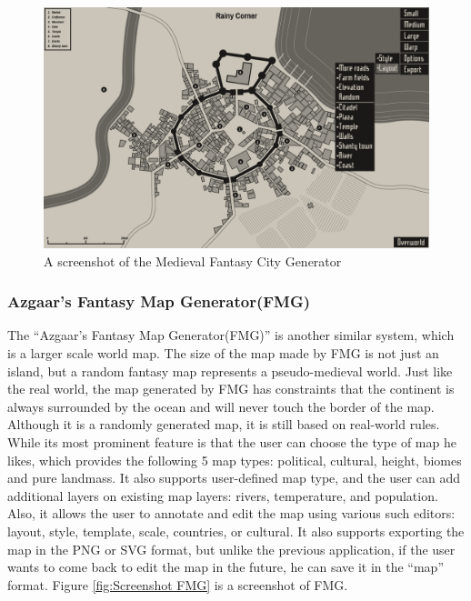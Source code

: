 \begin{figure}[!htb]
\centering
\includegraphics[width=\textwidth]{section01/assets/screenshot_MFCG.png}
\caption[A screenshot of the Medieval Fantasy City Generator]{\label{fig:Screenshot MFCG}A screenshot of the Medieval Fantasy City Generator}
\end{figure}

\subsubsection{Azgaar's Fantasy Map Generator(FMG)}
\label{sec:Introduction>Similar Systems>FMG}
The ``Azgaar's Fantasy Map Generator(FMG)'' is another similar system, which is a larger scale world map. The size of the map made by FMG is not just an island, but a random fantasy map represents a pseudo-medieval world. Just like the real world, the map generated by FMG has constraints that the continent is always surrounded by the ocean and will never touch the border of the map. Although it is a randomly generated map, it is still based on real-world rules. While its most prominent feature is that the user can choose the type of map he likes, which provides the following 5 map types: political, cultural, height, biomes and pure landmass. It also supports user-defined map type, and the user can add additional layers on existing map layers: rivers, temperature, and population. Also, it allows the user to annotate and edit the map using various such editors: layout, style, template, scale, countries, or cultural. It also supports exporting the map in the PNG or SVG format, but unlike the previous application, if the user wants to come back to edit the map in the future, he can save it in the ``map'' format. Figure \ref{fig:Screenshot FMG} is a screenshot of FMG.

